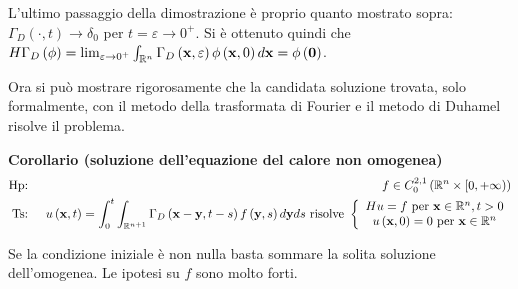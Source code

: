 \documentclass{article}
\begin{document}
L'ultimo passaggio della dimostrazione \`{e} proprio quanto mostrato sopra: $%
\Gamma _{D}\left( \cdot ,t\right) \rightarrow \delta _{0}$ per $%
t=\varepsilon \rightarrow 0^{+}$. Si \`{e} ottenuto quindi che $H\Gamma
_{D}\left( \phi \right) =\lim_{\varepsilon \rightarrow 0^{+}}\int_{%
\mathbb{R}
^{n}}\Gamma _{D}\left( \mathbf{x},\varepsilon \right) \phi \left( \mathbf{x}%
,0\right) d\mathbf{x}=\phi \left( \mathbf{0}\right) $.

Ora si pu\`{o} mostrare rigorosamente che la candidata soluzione trovata,
solo formalmente, con il metodo della trasformata di Fourier e il metodo di
Duhamel risolve il problema.

\textbf{Corollario (soluzione dell'equazione del calore non omogenea)}%
\begin{eqnarray*}
\text{Hp}\text{: } &&f\in C_{0}^{2,1}\left( 
\mathbb{R}
^{n}\times \lbrack 0,+\infty )\right) \\
\text{Ts}\text{: } &&u\left( \mathbf{x},t\right) =\int_{0}^{t}\int_{%
\mathbb{R}
^{n+1}}\Gamma _{D}\left( \mathbf{x-y},t-s\right) f\left( \mathbf{y},s\right)
d\mathbf{y}ds\text{ risolve }\left\{ 
\begin{array}{c}
Hu=f\text{ per }\mathbf{x}\in 
\mathbb{R}
^{n},t>0 \\ 
u\left( \mathbf{x},0\right) =0\text{ per }\mathbf{x}\in 
\mathbb{R}
^{n}%
\end{array}%
\right.
\end{eqnarray*}

Se la condizione iniziale \`{e} non nulla basta sommare la solita soluzione
dell'omogenea. Le ipotesi su $f$ sono molto forti.
\end{document}
